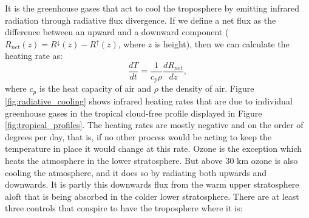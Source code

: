 \documentclass[12pt]{book}
\begin{document}
It is the greenhouse gases that act to cool the troposphere by emitting infrared radiation through radiative flux divergence. If we define a net flux as the difference between an upward and a downward component ($R_{net}(z) = R^\downarrow(z) - R^\uparrow(z)$, where $z$ is height), then we can calculate the heating rate as:
\begin{equation}
\frac{dT}{dt} = \frac{1}{c_p \rho}\frac{dR_{net}}{dz},
\end{equation}
where $c_p$ is the heat capacity of air and $\rho$ the density of air. Figure \ref{fig:radiative_cooling} shows infrared heating rates that are due to individual greenhouse gases in the tropical cloud-free profile displayed in Figure \ref{fig:tropical_profiles}. The heating rates are mostly negative and on the order of degrees per day, that is, if no other process would be acting to keep the temperature in place it would change at this rate. Ozone is the exception which heats the atmosphere in the lower stratosphere. But above 30 km ozone is also cooling the atmosphere, and it does so by radiating both upwards and downwards. It is partly this downwards flux from the warm upper stratosphere aloft that is being absorbed in the colder lower stratosphere. There are at least three controls that conspire to have the troposphere where it is:
\end{document}
